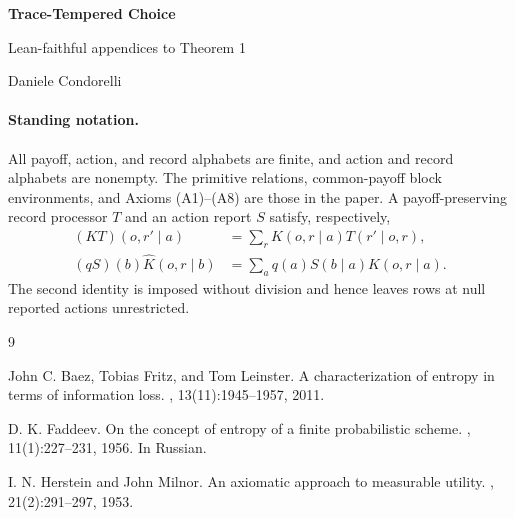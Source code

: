 \documentclass[11pt,a4paper]{article}
\theoremstyle{definition}
\newcommand{\1}{\mathbf 1}
\begin{document}
\begin{center}
{\Large\bfseries Trace-Tempered Choice}\par
\vspace{0.4em}
{\large Lean-faithful appendices to Theorem 1}\par
\vspace{0.6em}
Daniele Condorelli
\end{center}

\paragraph{Standing notation.}
All payoff, action, and record alphabets are finite, and action and record
alphabets are nonempty.  The primitive relations, common-payoff block
environments, and Axioms \textup{(A1)--(A8)} are those in the paper.  A
payoff-preserving record processor $T$ and an action report $S$ satisfy,
respectively,
\begin{align}
(KT)(o,r'\mid a)
  &=\sum_r K(o,r\mid a)T(r'\mid o,r),
  \label{eq:record-processing}\\
(qS)(b)\widehat K(o,r\mid b)
  &=\sum_a q(a)S(b\mid a)K(o,r\mid a).
  \label{eq:action-processing}
\end{align}
The second identity is imposed without division and hence leaves rows at null
reported actions unrestricted.

\tableofcontents

\appendix


\clearpage


\begin{thebibliography}{9}

John C. Baez, Tobias Fritz, and Tom Leinster.
\newblock A characterization of entropy in terms of information loss.
, 13(11):1945--1957, 2011.

D. K. Faddeev.
\newblock On the concept of entropy of a finite probabilistic scheme.
, 11(1):227--231, 1956.
\newblock In Russian.

I. N. Herstein and John Milnor.
\newblock An axiomatic approach to measurable utility.
, 21(2):291--297, 1953.

\end{thebibliography}
\end{document}
